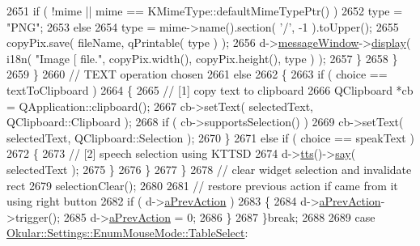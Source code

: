 \begin{DoxyCode}
{{2651                         \textcolor{keywordflow}{if} ( !mime || mime == KMimeType::defaultMimeTypePtr() )
2652                             type = \textcolor{stringliteral}{"PNG"};
2653                         \textcolor{keywordflow}{else}
2654                             type = mime->name().section( \textcolor{charliteral}{'/'}, -1 ).toUpper();
2655                         copyPix.save( fileName, qPrintable( type ) );
2656                         d->\hyperlink{classPageViewPrivate_aa836af37149ea9fbfefd8de357c9194b}{messageWindow}->\hyperlink{classPageViewMessage_a7fd107b1b7a6c0ae64a4d09fc2467982}{display}( i18n( \textcolor{stringliteral}{"Image [%
       file."}, copyPix.width(), copyPix.height(), type ) );
2657                     \}
2658                 \}
2659             \}
2660             \textcolor{comment}{// TEXT operation chosen}
2661             \textcolor{keywordflow}{else}
2662             \{
2663                 \textcolor{keywordflow}{if} ( choice == textToClipboard )
2664                 \{
2665                     \textcolor{comment}{// [1] copy text to clipboard}
2666                     QClipboard *cb = QApplication::clipboard();
2667                     cb->setText( selectedText, QClipboard::Clipboard );
2668                     \textcolor{keywordflow}{if} ( cb->supportsSelection() )
2669                         cb->setText( selectedText, QClipboard::Selection );
2670                 \}
2671                 \textcolor{keywordflow}{else} \textcolor{keywordflow}{if} ( choice == speakText )
2672                 \{
2673                     \textcolor{comment}{// [2] speech selection using KTTSD}
2674                     d->\hyperlink{classPageViewPrivate_afec701325b31f3ef894801171a11353f}{tts}()->\hyperlink{classOkularTTS_a2dc39591e328570027884f725c20ac7a}{say}( selectedText );
2675                 \}
2676             \}
2677             \}
2678             \textcolor{comment}{// clear widget selection and invalidate rect}
2679             selectionClear();
2680 
2681             \textcolor{comment}{// restore previous action if came from it using right button}
2682             \textcolor{keywordflow}{if} ( d->\hyperlink{classPageViewPrivate_a63b5ccd8ed0f4ac9a89c040aeb3173a9}{aPrevAction} )
2683             \{
2684                 d->\hyperlink{classPageViewPrivate_a63b5ccd8ed0f4ac9a89c040aeb3173a9}{aPrevAction}->trigger();
2685                 d->\hyperlink{classPageViewPrivate_a63b5ccd8ed0f4ac9a89c040aeb3173a9}{aPrevAction} = 0;
2686             \}
2687             \}\textcolor{keywordflow}{break};
2688 
2689         \textcolor{keywordflow}{case} \hyperlink{classOkular_1_1Settings_1_1EnumMouseMode_ab2ae04e2d7d069f02195ccf32c52415ba5422065f9d7eff6cc08eef755e862af3}{Okular::Settings::EnumMouseMode::TableSelect}:
}}
\end{DoxyCode}
